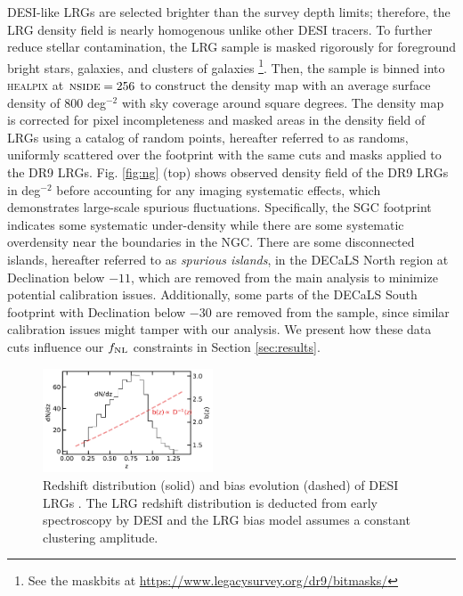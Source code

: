 DESI-like LRGs are selected brighter than the survey depth limits; therefore, the LRG density field is nearly homogenous unlike other DESI tracers. To further reduce stellar contamination, the LRG sample is masked rigorously for foreground bright stars, galaxies, and clusters of galaxies \footnote{See the maskbits at \url{https://www.legacysurvey.org/dr9/bitmasks/}}. Then, the sample is binned into \textsc{healpix} \citep{gorski2005healpix} at $\textsc{nside}=256$ to construct the density map with an average surface density of $800$ deg$^{-2}$ with sky coverage around  square degrees. The density map is corrected for pixel incompleteness and masked areas in the density field of LRGs using a catalog of random points, hereafter referred to as randoms, uniformly scattered over the footprint with the same cuts and masks applied to the DR9 LRGs. Fig. \ref{fig:ng} (top) shows observed density field of the DR9 LRGs in deg$^{-2}$ before accounting for any imaging systematic effects, which demonstrates large-scale spurious fluctuations. Specifically, the SGC footprint indicates some systematic under-density while there are some systematic overdensity near the boundaries in the NGC. There are some disconnected islands, hereafter referred to as \textit{spurious islands}, in the DECaLS North region at Declination below $-11$, which are removed from the main analysis to minimize potential calibration issues. Additionally, some parts of the DECaLS South footprint with Declination below $-30$ are removed from the sample, since similar calibration issues might tamper with our analysis. We present how these data cuts influence our $f_{\rm NL}$ constraints in Section \ref{sec:results}.


\begin{figure}
    \centering
    \includegraphics[width=0.45\textwidth]{figures/nz_lrg.pdf}
    \caption{Redshift distribution (solid) and bias evolution (dashed) of DESI LRGs \citep{zhou2021clustering, zhou2022target}. The LRG redshift distribution is deducted from early spectroscopy by DESI and the LRG bias model assumes a constant clustering amplitude.}
    \label{fig:nz}
\end{figure}

